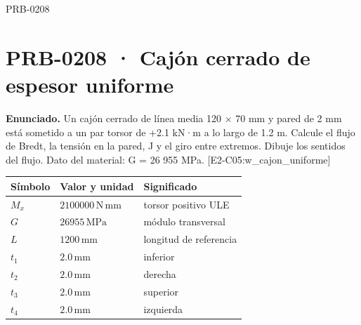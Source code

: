 \begin{studiumworked}{PRB-0208}

\section{PRB-0208 · Cajón cerrado de espesor uniforme}

\textbf{Enunciado.} Un cajón cerrado de línea media 120 \ensuremath{\times} 70 mm y pared de 2 mm está sometido a un par torsor de +2.1 kN·m a lo largo de 1.2 m. Calcule el flujo de Bredt, la tensión en la pared, J y el giro entre extremos. Dibuje los sentidos del flujo. Dato del material: G = 26 955 MPa. [E2-C05:w\_cajon\_uniforme]

\par\medskip\noindent\begin{tabular}{@{}p{.18\linewidth}p{.26\linewidth}p{.48\linewidth}@{}}
\toprule Símbolo & Valor y unidad & Significado\\\midrule
$M_{x}$ & $2100000\,\mathrm{N\,mm}$ & torsor positivo ULE\\
$G$ & $26955\,\mathrm{MPa}$ & módulo transversal\\
$L$ & $1200\,\mathrm{mm}$ & longitud de referencia\\
$t_{1}$ & $2.0\,\mathrm{mm}$ & inferior\\
$t_{2}$ & $2.0\,\mathrm{mm}$ & derecha\\
$t_{3}$ & $2.0\,\mathrm{mm}$ & superior\\
$t_{4}$ & $2.0\,\mathrm{mm}$ & izquierda\\
\bottomrule\end{tabular}\par\medskip


\end{studiumworked}
